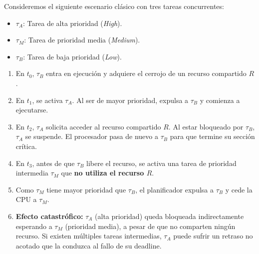 Consideremos el siguiente escenario clásico con tres tareas concurrentes:
\begin{itemize}
    \item $\tau_A$: Tarea de alta prioridad (\textit{High}).
    \item $\tau_M$: Tarea de prioridad media (\textit{Medium}).
    \item $\tau_B$: Tarea de baja prioridad (\textit{Low}).
\end{itemize}

\begin{enumerate}
    \item En $t_0$, $\tau_B$ entra en ejecución y adquiere el cerrojo de un recurso compartido $R$.
    \item En $t_1$, se activa $\tau_A$. Al ser de mayor prioridad, expulsa a $\tau_B$ y comienza a ejecutarse.
    \item En $t_2$, $\tau_A$ solicita acceder al recurso compartido $R$. Al estar bloqueado por $\tau_B$, $\tau_A$ se suspende. El procesador pasa de nuevo a $\tau_B$ para que termine su sección crítica.
    \item En $t_3$, antes de que $\tau_B$ libere el recurso, se activa una tarea de prioridad intermedia $\tau_M$ que \textbf{no utiliza el recurso $R$}.
    \item Como $\tau_M$ tiene mayor prioridad que $\tau_B$, el planificador expulsa a $\tau_B$ y cede la CPU a $\tau_M$.
    \item \textbf{Efecto catastrófico:} $\tau_A$ (alta prioridad) queda bloqueada indirectamente esperando a $\tau_M$ (prioridad media), a pesar de que no comparten ningún recurso. Si existen múltiples tareas intermedias, $\tau_A$ puede sufrir un retraso no acotado que la conduzca al fallo de su deadline.
\end{enumerate}

